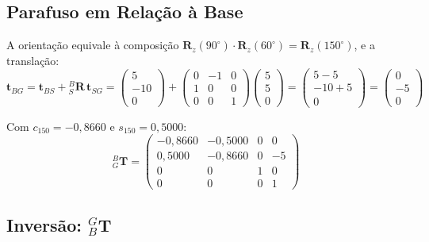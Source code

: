 \documentclass[12pt,a4paper]{article}
\newcommand{\Rot}[2]{{}^{#1}_{#2}\!\mathbf{R}}
\newcommand{\Trans}[2]{{}^{#1}_{#2}\!\mathbf{T}}
\newcommand{\Rz}[1]{\mathbf{R}_z(#1)}
\newcommand{\degr}{^{\circ}}
\begin{document}
\subsection{Parafuso em Relação à Base}

A orientação equivale à composição $\Rz{90\degr}\cdot\Rz{60\degr} = \Rz{150\degr}$, e a translação:
\[
  \mathbf{t}_{BG} = \mathbf{t}_{BS} + \Rot{B}{S}\,\mathbf{t}_{SG}
  = \begin{pmatrix}5\\-10\\0\end{pmatrix}
  + \begin{pmatrix}0 & -1 & 0\\1 & 0 & 0\\0 & 0 & 1\end{pmatrix}
  \begin{pmatrix}5\\5\\0\end{pmatrix}
  = \begin{pmatrix}5-5\\-10+5\\0\end{pmatrix}
  = \begin{pmatrix}0\\-5\\0\end{pmatrix}
\]

Com $c_{150}=-0{,}8660$ e $s_{150}=0{,}5000$:
\[
\Trans{B}{G} =
\begin{pmatrix}
 -0{,}8660 & -0{,}5000 & 0 &  0 \\
  0{,}5000 & -0{,}8660 & 0 & -5 \\
  0        &  0        & 1 &  0 \\
  0        &  0        & 0 &  1
\end{pmatrix}
\]

\subsection{Inversão: ${}^{G}_{B}\mathbf{T}$}
\end{document}
